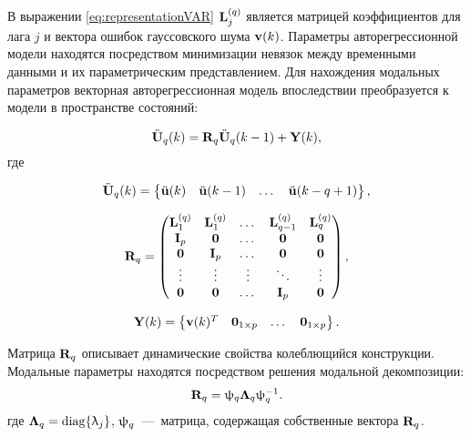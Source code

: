 В выражении \eqref{eq:representationVAR} $ \mathbf{L}_j^{(q)} $ является матрицей коэффициентов для лага $ j $ и вектора ошибок гауссовского шума $ \mathbf{v}(k) $. Параметры авторегрессионной модели находятся посредством минимизации невязок между временными данными и их параметрическим представлением. Для нахождения модальных параметров векторная авторегрессионная модель впоследствии преобразуется к модели в пространстве состояний:

\begin{equation}
	\ddot{\mathbf{U}}_q(k) = \mathbf{R}_q \ddot{\mathbf{U}}_q(k - 1) + \mathbf{Y}(k),
\end{equation} 
где 

\begin{equation}
	 \ddot{\mathbf{U}}_q(k) = \begin{Bmatrix} \ddot{\mathbf{u}}(k) & \ddot{\mathbf{u}}(k - 1) & \dots & \ddot{\mathbf{u}}(k - q + 1) \end{Bmatrix},
\end{equation}

\begin{equation}
	\mathbf{R}_q = 
	\begin{pmatrix}
		\mathbf{L}_1^{(q)} & \mathbf{L}_1^{(q)} & \dots & \mathbf{L}_{q-1}^{(q)} & \mathbf{L}_q^{(q)} \\
		\mathbf{I}_p & \mathbf{0} & \dots & \mathbf{0} & \mathbf{0} \\ 
		\mathbf{0} & \mathbf{I}_p & \dots & \mathbf{0} & \mathbf{0} \\ 
		\vdots & \vdots & \vdots & \ddots & \vdots \\ 
		\mathbf{0} & \mathbf{0} & \dots & \mathbf{I}_p & \mathbf{0} 
	\end{pmatrix},
\end{equation}

\begin{equation}
	\mathbf{Y}(k) = \begin{Bmatrix} \mathbf{v}(k) ^ T & \mathbf{0}_{1 \times p} & \dots & \mathbf{0}_{1 \times p} \end{Bmatrix}.
\end{equation}

Матрица $ \mathbf{R}_q $ описывает динамические свойства колеблющийся конструкции. Модальные параметры находятся посредством решения модальной декомпозиции:
\begin{equation}
	\mathbf{R}_q = \uppsi_q \mathbf{\Lambda}_q \uppsi_q^{-1}.
\end{equation}
где $ \mathbf{\Lambda}_q = \operatorname{diag} \{ \uplambda_j \} $, $ \mathbf{\uppsi}_q $~---~матрица, содержащая собственные вектора $ \mathbf{R}_q $.

